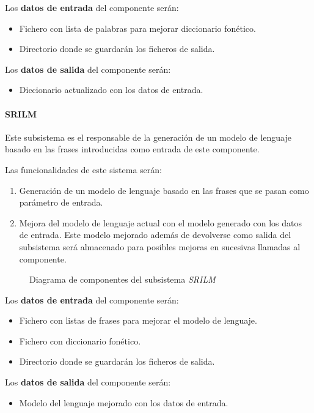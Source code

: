 \documentclass[../main.tex]{subfiles}
\begin{document}
Los \textbf{datos de entrada} del componente serán:
\begin{itemize}
    \item Fichero con lista de palabras para mejorar diccionario fonético.
    \item Directorio donde se guardarán los ficheros de salida.
\end{itemize}

Los \textbf{datos de salida} del componente serán:
\begin{itemize}
    \item Diccionario actualizado con los datos de entrada.
\end{itemize}

\paragraph{SRILM}\label{par:srilm}
Este subsistema es el responsable de la generación de un modelo de lenguaje basado en las frases introducidas como entrada de este componente.

Las funcionalidades de este sistema serán:
\begin{enumerate}
    \item Generación de un modelo de lenguaje basado en las frases que se pasan como parámetro de entrada.
    \item Mejora del modelo de lenguaje actual con el modelo generado con los datos de entrada. Este modelo mejorado además de devolverse como salida del subsistema será almacenado para posibles mejoras en sucesivas llamadas al componente.
\end{enumerate}

\begin{figure}[H]
    \centering
    
    \label{fig:components_srilm}
    \caption{Diagrama de componentes del subsistema \textit{SRILM}}
\end{figure}

Los \textbf{datos de entrada} del componente serán:
\begin{itemize}
    \item Fichero con listas de frases para mejorar el modelo de lenguaje.
    \item Fichero con diccionario fonético.
    \item Directorio donde se guardarán los ficheros de salida.
\end{itemize}

Los \textbf{datos de salida} del componente serán:
\begin{itemize}
    \item Modelo del lenguaje mejorado con los datos de entrada.
\end{itemize}
\end{document}
